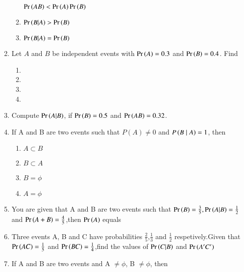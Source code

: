 \begin{enumerate}[label=\thesubsection.\arabic*,ref=\thesubsection.\theenumi]
\begin{multicols}{2}
\begin{enumerate}
  \label{12.13.6.18.B}
 $\Pr\left(AB\right)< \Pr\left(A\right)\Pr\left(B\right)$
 \item 
 \label{12.13.6.18.C}
 $\Pr\left(B|A\right) > \Pr\left(B\right)$
 \item 
  \label{12.13.6.18.D}
 $\Pr\left(B|A\right) = \Pr\left(B\right)$
 \end{enumerate}
\end{multicols}
\solution 

\item Let  $A$ and $B$ be independent events with $\Pr\left(A\right) = 0.3$ and $\Pr\left(B\right) = 0.4$. Find 
\begin{enumerate}
\item {} \item {}

\item {} \item {}
\end{enumerate}
\solution

\item Compute $\Pr\left(A|B\right)$, if $\Pr\left(B\right) = 0.5$ and $\Pr\left(AB\right) = 0.32$.\\
	\solution
	
	\item If A and B are two events such that $P(A) \neq 0$ and $P\left(B\mid A\right) = 1$, then
\begin{multicols}{4}
\begin{enumerate}
\item $A \subset B$
\item $B\subset A$
\item $B = \phi$
\item $A = \phi$
\end{enumerate}
\end{multicols}
		\solution
		
\item You are given that A and B are two events such that $\Pr\left(B\right)=\frac{3}{5},\Pr\left(A|B\right)=\frac{1}{2}$ and $\Pr\left(A+B\right)=\frac{4}{5}$,then $\Pr\left(A\right)$ equals\\
\solution

\item Three events A, B and C have probabilities $\frac{2}{5}$,$\frac{1}{3}$ and $\frac{1}{2}$ respetively.Given that $\Pr\left(AC\right)=\frac{1}{5}$ and $\Pr\left(BC\right)=\frac{1}{4}$,find the values of $\Pr\left(C | B\right)$ and $\Pr\left(A^{\prime} C^{\prime}\right)$\\
\solution

%
\item If A and B are two events and A $\ne \phi$, B $\ne \phi$, then
\begin{multicols}{2}
\begin{enumerate}

\end{enumerate}
\end{multicols}
\end{enumerate}
